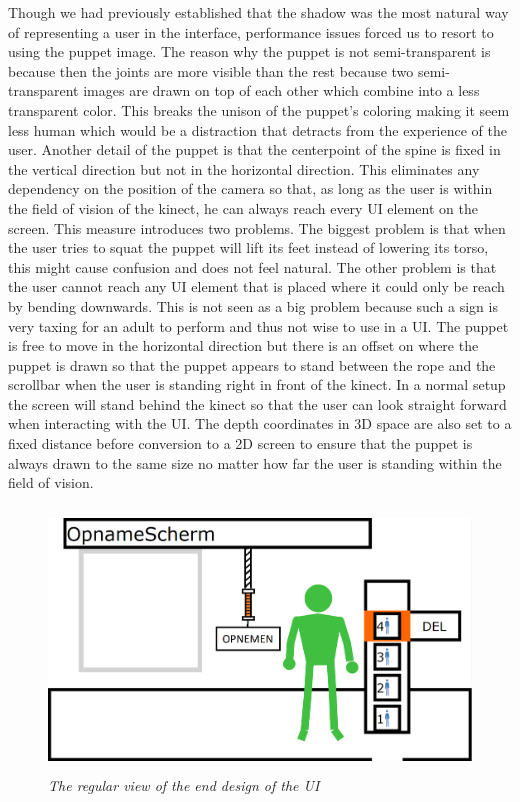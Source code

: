 Though we had previously established that the shadow was the most natural way of representing a user in the interface, performance issues forced us to resort to using the puppet image. The reason why the puppet is not semi-transparent is because then the joints are  more visible than the rest because two semi-transparent images are drawn on top of each other which combine into a less transparent color. This breaks the unison of the puppet's coloring making it seem less human which would be a distraction that detracts from the experience of the user. Another detail of the puppet is that the centerpoint of the spine is fixed in the vertical direction but not in the horizontal direction. This eliminates any dependency on the position of the camera so that, as long as the user is within the field of vision of the kinect, he can always reach every UI element on the screen. This measure introduces two  problems. The biggest problem is that when the user tries to squat the puppet will lift its feet instead of lowering its torso, this might cause confusion and does not feel natural. The other problem is that the user cannot reach any UI element that is placed where it could only be reach by bending downwards. This is not seen as a big problem because such a sign is very taxing for an adult to perform and thus not wise to use in a UI. The puppet is free to move in the horizontal direction but there is an offset on where the puppet is drawn so that the puppet appears to stand between the rope and the scrollbar when the user is standing right in front of the kinect. In a normal setup the screen will stand behind the kinect so that the user can look straight forward when interacting with the UI. The depth coordinates in 3D space are also set to a fixed distance before conversion to a 2D screen to ensure that the puppet is always drawn to the same size no matter how far the user is standing within the field of vision.

\begin{figure}[H]
	\begin{center}
		\includegraphics[width=12.5cm, height=7cm]{figures/1_screen_with_user.png}
		\caption{\emph{The regular view of the end design of the UI}}
		\label{regular view end design}
	\end{center}
\end{figure}

